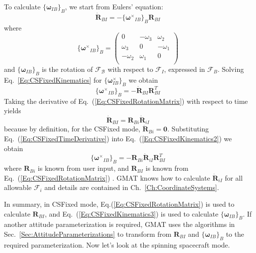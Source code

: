 To calculate $\{\mathbf{\boldsymbol\omega}_{IB}\}_B$, we start from
Eulers' equation:
%
\begin{equation}
   \dot{\mathbf{R}}_{BI} =
   -\{\mathbf{\boldsymbol\omega^\times}_{IB}\}_B\mathbf{R}_{BI}
   \label{Eq:CSFixedKinematics}
\end{equation}
%
where
%
\begin{equation}
       \{ \mathbf{\boldsymbol\omega^\times}_{IB}\}_B = \begin{pmatrix}
     0 & -\omega_3 & \omega_2\\
     \omega_3 & 0 & -\omega_1\\
     -\omega_2 & \omega_1 & 0\\
     \end{pmatrix}
\end{equation}
%
and $\{\mathbf{\boldsymbol\omega}_{IB}\}_B$ is the rotation of
$\mathcal{F_B}$ with respect to $\mathcal{F}_I$, expressed in
$\mathcal{F}_B$.
%
Solving Eq.~\ref{Eq:CSFixedKinematics} for
$\{\mathbf{\boldsymbol\omega}_{IB}^\times\}_B$ we obtain
%
\begin{equation}
   \{\mathbf{\boldsymbol\omega^\times}_{IB}\}_B =  -\dot{\mathbf{R}}_{BI}
   \mathbf{R}_{BI}^{T}
   \label{Eq:CSFixedKinematics2}
\end{equation}
%
Taking the derivative of Eq.~(\ref{Eq:CSFixedRotationMatrix}) with
respect to time yields
%
\begin{equation}
     {\mathbf{\dot R}_{BI}} = \mathbf{R}_{Bi}{\mathbf{\dot
     R}_{iI}}\label{Eq:CSFixedTimeDerivative}
\end{equation}
%
because by definition, for the CSFixed mode,  $ \mathbf{\dot R}_{Bi}
= \mathbf{0}$. Substituting Eq.~(\ref{Eq:CSFixedTimeDerivative})
into Eq.~(\ref{Eq:CSFixedKinematics2}) we obtain
%
%
\begin{equation}
   \{\mathbf{\boldsymbol\omega^\times}_{IB}\}_B =  -\mathbf{R}_{Bi}{\mathbf{\dot
     R}_{iI}} \mathbf{R}_{BI}^{T}
   \label{Eq:CSFixedKinematics3}
\end{equation}
%
where $\mathbf{R}_{Bi}$ is known from user input, and
$\mathbf{R}_{BI}$ is known from Eq.~(\ref{Eq:CSFixedRotationMatrix})
. GMAT knows how to calculate $\mathbf{\dot{R}}_{iI}$ for all
allowable $\mathcal{F}_i$ and details are contained in
Ch.~\ref{Ch:CoordinateSystems}.

In summary, in CSFixed mode, Eq.(\ref{Eq:CSFixedRotationMatrix}) is
used to calculate $\mathbf{R}_{BI}$, and
Eq.~(\ref{Eq:CSFixedKinematics3}) is used to calculate
$\{\mathbf{\boldsymbol\omega}_{IB}\}_B$.  If another attitude
parameterization is required, GMAT uses the algorithms in
Sec.~\ref{Sec:AttitudeParameterizations} to transform from
$\mathbf{R}_{BI}$ and $\{\mathbf{\boldsymbol\omega}_{IB}\}_B$ to the
required parameterization.  Now let's look at the spinning
spacecraft mode.

